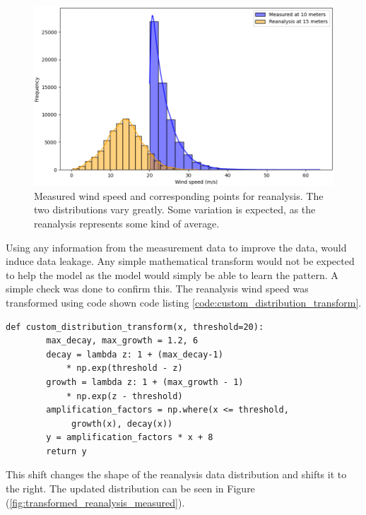 \begin{figure}
    \centering
    \includegraphics[scale=0.65]{Figures/difference_measured_reanalysis_cropped.png}
    \caption[Measured wind speed and corresponding points for reanalysis.]{Measured wind speed and corresponding points for reanalysis. The two distributions vary greatly. Some variation is expected, as the reanalysis represents some kind of average.}
    \label{fig:difference_measured_reanalysis}
\end{figure}

Using any information from the measurement data to improve the data, would induce data leakage. Any simple mathematical transform would not be expected to help the model as the model would simply be able to learn the pattern. A simple check was done to confirm this. The reanalysis wind speed was transformed using code shown code listing \ref{code:custom_distribution_transform}.

\begin{lstlisting}[style = Python, caption = {Custom transform method}, label = code:custom_distribution_transform]
    def custom_distribution_transform(x, threshold=20):
        max_decay, max_growth = 1.2, 6
        decay = lambda z: 1 + (max_decay-1) 
            * np.exp(threshold - z)
        growth = lambda z: 1 + (max_growth - 1) 
            * np.exp(z - threshold)
        amplification_factors = np.where(x <= threshold,
             growth(x), decay(x))
        y = amplification_factors * x + 8
        return y
\end{lstlisting}

This shift changes the shape of the reanalysis data distribution and shifts it to the right. The updated distribution can be seen in Figure (\ref{fig:transformed_reanalysis_measured}).

